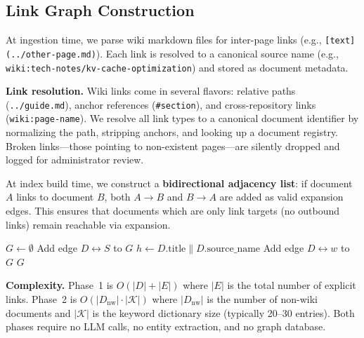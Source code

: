 \documentclass[sigconf,review]{acmart}
\begin{document}
\subsection{Link Graph Construction}
\label{sec:construction}

At ingestion time, we parse wiki markdown files for inter-page links
(e.g., \texttt{[text](../other-page.md)}).  Each link is resolved to a canonical
source name (e.g., \texttt{wiki:tech-notes/kv-cache-optimization}) and stored as
document metadata.

\textbf{Link resolution.}  Wiki links come in several flavors: relative
paths (\texttt{../guide.md}), anchor references (\texttt{\#section}), and
cross-repository links (\texttt{wiki:page-name}).  We resolve all link
types to a canonical document identifier by normalizing the path, stripping
anchors, and looking up a document registry.  Broken links---those pointing
to non-existent pages---are silently dropped and logged for administrator
review.

At index build time, we construct a \textbf{bidirectional adjacency list}:
if document $A$ links to document $B$, both $A \to B$ and $B \to A$ are added as valid
expansion edges.  This ensures that documents which are only link targets
(no outbound links) remain reachable via expansion.

\begin{algorithm}[t]
\caption{Link Graph Construction}
\label{alg:construction}
\begin{algorithmic}[1]
  \State $G \gets \emptyset$
  \Statex {}
      \State Add edge $D \leftrightarrow S$ to $G$ 
    \EndFor
  \EndFor
  \Statex {}
    \State $h \gets D.\text{title} \mathbin{\|} D.\text{source\_name}$
          \State Add edge $D \leftrightarrow w$ to $G$
        \EndFor
      \EndIf
    \EndFor
  \EndFor
  \State \Return $G$
\EndFunction
\end{algorithmic}
\end{algorithm}

\textbf{Complexity.}
Phase~1 is $O(|D| + |E|)$ where $|E|$ is the total number of explicit links.
Phase~2 is $O(|D_{\text{nw}}| \cdot |\mathcal{K}|)$ where $|D_{\text{nw}}|$ is
the number of non-wiki documents and $|\mathcal{K}|$ is the keyword dictionary
size (typically 20--30 entries).  Both phases require no LLM calls, no entity
extraction, and no graph database.
\end{document}
